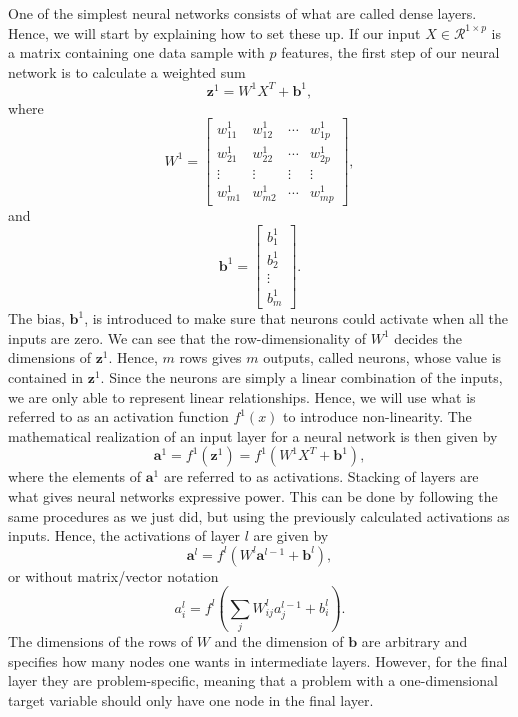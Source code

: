 One of the simplest neural networks consists of what are called dense layers. Hence, we will start by explaining how to set these up. If our input $X \in \mathcal{R}^{1\times p}$ is a matrix containing one data sample with $p$ features, the first step of our neural network is to calculate a weighted sum
$$\boldsymbol{z}^1 = W^1X^T + \boldsymbol{b}^1,$$
where
$$ W^1 =
\begin{bmatrix}
    w^1_{11}       & w^1_{12} &  \cdots & w^1_{1p} \\
    w^1_{21}       & w^1_{22} & \cdots & w^1_{2p} \\
    \vdots & \vdots & \vdots & \vdots  \\
    w^1_{m1}       & w^1_{m2} &  \cdots & w^1_{mp} 
\end{bmatrix},
$$
and
$$ \boldsymbol{b}^1 =
\begin{bmatrix}
    b^1_1       \\
    b^1_2        \\
    \vdots  \\
    b^1_m
\end{bmatrix}.
$$
The bias, $\boldsymbol{b}^1$, is introduced to make sure that neurons could activate when all the inputs are zero. We can see that the row-dimensionality of $W^1$ decides the dimensions of $\boldsymbol{z}^1$. Hence, $m$ rows gives $m$ outputs, called neurons, whose value is contained in $\boldsymbol{z}^1$. Since the neurons are simply a linear combination of the inputs, we are only able to represent linear relationships. Hence, we will use what is referred to as an activation function $f
^1(x)$ to introduce non-linearity.
The mathematical realization of an input layer for a neural network is then given by
$$\boldsymbol{a}^1 = f^1(\boldsymbol{z}^1) = f^1(W^1X^T + \boldsymbol{b}^1),$$
where the elements of $\boldsymbol{a}^1$ are referred to as activations.
Stacking of layers are what gives neural networks expressive power. This can be done by following the same procedures as we just did, but using the previously calculated activations as inputs. Hence, the activations of layer $l$ are given by \cite{handsonml}
\begin{equation}
    \label{eq:DenseLayer}
    \boldsymbol{a}^l = f^l(W^l \boldsymbol{a}^{l-1} + \boldsymbol{b}^l),
\end{equation}
or without matrix/vector notation
\begin{equation}
    \label{eq:DenseLayer}
    a^l_i = f^l(\sum_{j}W^l_{ij}a_j^{l-1} + b^l_i).
\end{equation}
The dimensions of the rows of $W$ and the dimension of $\boldsymbol{b}$ are arbitrary and specifies how many nodes one wants in intermediate layers. However, for the final layer they are problem-specific, meaning that a problem with a one-dimensional target variable should only have one node in the final layer.


